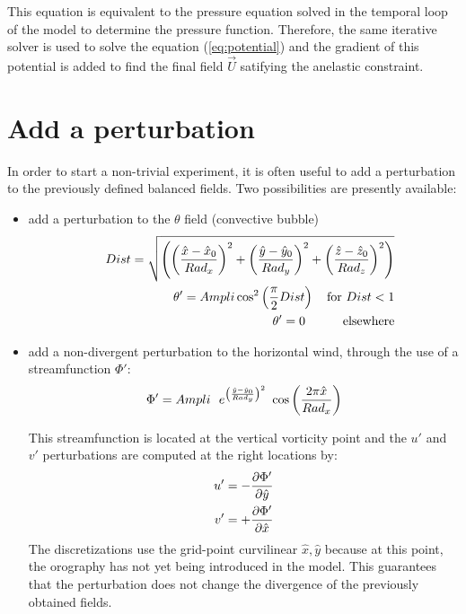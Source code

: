 This equation is equivalent to the pressure equation solved in the temporal loop
of the model to determine the pressure function. Therefore, the same iterative
solver is used to solve the equation (\ref{eq:potential}) and the gradient of this
potential is added to find the final field $\vec{U}$ satifying  the anelastic constraint.


\section{Add a perturbation}

In order to start a non-trivial experiment, it is often useful to add
a perturbation to the previously defined balanced fields. Two possibilities
are presently available:

\begin{itemize}
\item
add a perturbation to the $\theta $ field (convective bubble)
\begin{eqnarray}
&&Dist = \sqrt{ \left( \left( { \hat{x} - \hat{x}_0    \over  Rad_x } \right) ^2 +
                       \left( { \hat{y} - \hat{y}_0    \over  Rad_y } \right) ^2 +
                       \left( { \hat{z} - \hat{z}_0    \over  Rad_z } \right) ^2
                \right)       }  \nonumber \\
&&\theta ' =  Ampli \cos ^2  \left( {\pi \over 2} Dist  \right)  \ \ \
\mbox{for} \ Dist < 1  \nonumber \\
&&\theta ' = 0  \ \ \  \ \ \  \ \ \  \mbox{elsewhere}  \nonumber
\end{eqnarray}

\item
add a non-divergent perturbation to the horizontal wind, through the use of a
streamfunction $\Phi '$:
\begin{equation}
\Phi ' = Ampli \ \  e^{\left( { \hat{y} - \hat{y}_0    \over  Rad_y } \right) ^2 }
\  \cos \left( {2 \pi  \hat{x} \over  Rad_x } \right)   \nonumber
\end{equation}

This streamfunction is located at the vertical vorticity point and the $u'$
and $v'$ perturbations are computed at the right locations by:
\begin{eqnarray}
u' = - { \partial \Phi ' \over \partial \hat{y} } \nonumber \\
v' = + { \partial \Phi ' \over \partial \hat{x} } \nonumber
\end{eqnarray}
The discretizations use the grid-point curvilinear $ \hat{x}, \hat{y}$ because
at this point, the orography has  not yet  being  introduced in  the model.
This guarantees that the perturbation does not change the  divergence of the
previously obtained fields.
\end{itemize}



